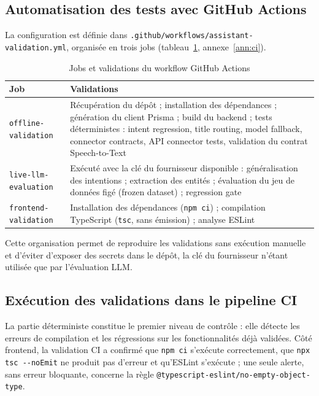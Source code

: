 \documentclass[11pt,a4paper,openany,oneside]{report}
\begin{document}
\subsection{Automatisation des tests avec GitHub Actions}\label{sec:ci-jobs}
La configuration est définie dans \texttt{.github/workflows/assistant-validation.yml}, organisée en trois jobs (tableau~\ref{tab:ci-jobs}, annexe~\ref{ann:ci}).

\begin{table}[htbp]
\centering\small
\caption{Jobs et validations du workflow GitHub Actions}\label{tab:ci-jobs}
\begin{tabularx}{\textwidth}{@{}p{3.3cm}X@{}}
\toprule
\textbf{Job} & \textbf{Validations} \\
\midrule
\texttt{offline-validation} & Récupération du dépôt ; installation des dépendances ; génération du client Prisma ; build du backend ; tests déterministes : intent regression, title routing, model fallback, connector contracts, API connector tests, validation du contrat Speech-to-Text \\
\texttt{live-llm-evaluation} & Exécuté avec la clé du fournisseur disponible : généralisation des intentions ; extraction des entités ; évaluation du jeu de données figé (frozen dataset) ; regression gate \\
\texttt{frontend-validation} & Installation des dépendances (\texttt{npm ci}) ; compilation TypeScript (\texttt{tsc}, sans émission) ; analyse ESLint \\
\bottomrule
\end{tabularx}
\end{table}

Cette organisation permet de reproduire les validations sans exécution manuelle et d'éviter d'exposer des secrets dans le dépôt, la clé du fournisseur n'étant utilisée que par l'évaluation LLM.

\subsection{Exécution des validations dans le pipeline CI}
La partie déterministe constitue le premier niveau de contrôle : elle détecte les erreurs de compilation et les régressions sur les fonctionnalités déjà validées. Côté frontend, la validation CI a confirmé que \texttt{npm ci} s'exécute correctement, que \texttt{npx tsc -{}-noEmit} ne produit pas d'erreur et qu'ESLint s'exécute ; une seule alerte, sans erreur bloquante, concerne la règle \texttt{@typescript-eslint/no-empty-object-type}.
\end{document}
